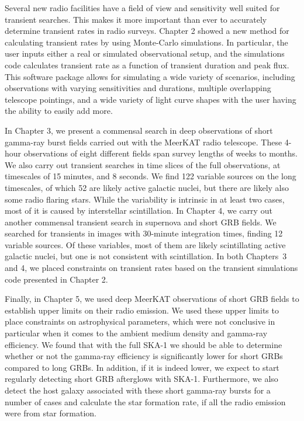 \documentclass[12pt]{article}
\begin{document}
Several new radio facilities have a field of view and sensitivity well suited for transient searches. This makes it more important than ever to accurately determine transient rates in radio surveys. Chapter 2 showed a new method for calculating transient rates by using Monte-Carlo simulations. In particular, the user inputs either a real or simulated observational setup, and the simulations code calculates transient rate as a function of transient duration and peak flux. This software package allows for simulating a wide variety of scenarios, including observations with varying sensitivities and durations, multiple overlapping telescope pointings, and a wide variety of light curve shapes with the user having the ability to easily add more.

In Chapter 3, we present a commensal search in deep observations of short gamma-ray burst fields carried out with the MeerKAT radio telescope. These 4-hour observations of eight different fields span survey lengths of weeks to months. We also carry out transient searches in time slices of the full observations, at timescales of 15 minutes, and 8 seconds. We find 122 variable sources on the long timescales, of which 52 are likely active galactic nuclei, but there are likely also some radio flaring stars. While the variability is intrinsic in at least two cases, most of it is caused by interstellar scintillation. In Chapter 4, we carry out another commensal transient search in supernova and short GRB fields. We searched for transients in images with 30-minute integration times, finding 12 variable sources. Of these variables, most of them are likely scintillating active galactic nuclei, but one is not consistent with scintillation. In both Chapters~3 and 4, we placed constraints on transient rates based on the transient simulations code presented in Chapter 2. 

Finally, in Chapter 5, we used deep MeerKAT observations of short GRB fields to establish upper limits on their radio emission. We used these upper limits to place constraints on astrophysical parameters, which were not conclusive in particular when it comes to the ambient medium density and gamma-ray efficiency. We found that with the full SKA-1 we should be able to determine whether or not the gamma-ray efficiency is significantly lower for short GRBs compared to long GRBs. In addition, if it is indeed lower, we expect to start regularly detecting short GRB afterglows with SKA-1. Furthermore, we also detect the host galaxy associated with these short gamma-ray bursts for a number of cases and calculate the star formation rate, if all the radio emission were from star formation. 
\end{document}
